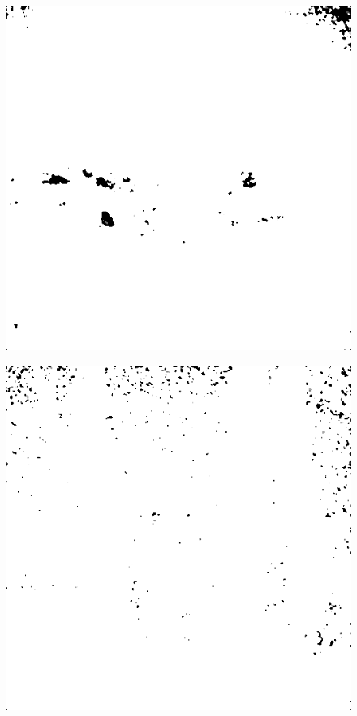 \begin{figure}[H]
\begin{minipage}[t]{0.245\textwidth}
    \subcaption{}
    \label{fig:good2}
\end{minipage}
\begin{minipage}[t]{0.245\textwidth}
    \includegraphics[width=1\textwidth]{result/SPC_NRQA/g22_512_m30.PNG}
    \subcaption{}
    \label{fig:good3}
\end{minipage}
\begin{minipage}[t]{0.245\textwidth}
    \includegraphics[width = \textwidth]{result/SPC_NRQA/g65_512_m30.PNG}

\end{minipage}
\end{figure}
